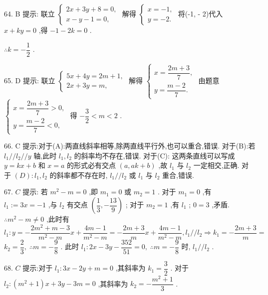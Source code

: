 64. B 提示: 联立 $\left\{  \begin{array}{l} {2x} + {3y} + 8 = 0, \\  x - y - 1 = 0, \end{array}\right.$ 解得 $\left\{  \begin{array}{l} x =  - 1, \\  y =  - 2. \end{array}\right.$ 将(-1, - 2)代入 $x + {ky} = 0$ ,得 $- 1 - {2k} = 0$ .

$\therefore k =  - \dfrac{1}{2}$ .

65. D 提示: 联立 $\left\{  \begin{array}{l} {5x} + {4y} = {2m} + 1, \\  {2x} + {3y} = m, \end{array}\right.$ 解得 $\left\{  \begin{array}{l} x = \dfrac{{2m} + 3}{7}, \\  y = \dfrac{m - 2}{7}. \end{array}\right.$ 由题意 $\left\{  \begin{array}{l} x = \dfrac{{2m} + 3}{7} > 0, \\  y = \dfrac{m - 2}{7} < 0, \end{array}\right.$ 得 $- \dfrac{3}{2} < m < 2$ .

66. C 提示:对于(A):两直线斜率相等,除两直线平行外,也可以重合,错误. 对于(B):若 ${l}_{1}//{l}_{2}//y$ 轴,此时 ${l}_{1},{l}_{2}$ 的斜率均不存在,错误. 对于(C): 这两条直线可以写成 $y = {kx} + b$ 和 $x = a$ 的形式必有交点 $\left( {a,{ak} + b}\right)$ ,故 ${l}_{1}$ 与 ${l}_{2}$ 一定相交,正确. 对于 $\left( D\right)  : {l}_{1},{l}_{2}$ 的斜率都不存在时, ${l}_{1}//{l}_{2}$ 或 ${l}_{1}$ 与 ${l}_{2}$ 重合,错误.

67. $C$ 提示: 若 ${m}^{2} - m = 0$ ,即 ${m}_{1} = 0$ 或 ${m}_{2} = 1$ . 对于 ${m}_{1} = 0$ ,有 ${l}_{1} \mathrel{\text{ := }} {3x} =  - 1$ ,与 ${l}_{2}$ 有交点 $\left( {\dfrac{1}{3}, - \dfrac{13}{9}}\right)$ ; 对于 ${m}_{2} = 1$ ,有 ${l}_{1}$ ; $0 = 3$ ,矛盾. $\therefore {m}^{2} - m \neq  0$ ,此时有 ${l}_{1} : y =  - \dfrac{2{m}^{2} + m - 3}{{m}^{2} - m}x + \dfrac{{4m} - 1}{{m}^{2} - m} =  - \dfrac{{2m} + 3}{m}x + \dfrac{{4m} - 1}{{m}^{2} - m},{l}_{1}//{l}_{2} \Rightarrow  {k}_{1} =  - \dfrac{{2m} + 3}{m} =$  ${k}_{2} = \dfrac{2}{3},\;\therefore m =  - \dfrac{9}{8}$ . 此时 ${l}_{1} : {2x} - {3y} - \dfrac{352}{51} = 0,\;\therefore m =  - \dfrac{9}{8}$ 时, ${l}_{1}//{l}_{2}$ .

68. $C$ 提示:对于 ${l}_{1} : {3x} - {2y} + m = 0$ ,其斜率为 ${k}_{1} = \dfrac{3}{2}$ . 对于 ${l}_{2} : \left( {{m}^{2} + 1}\right) x + {3y} - {3m} = 0$ ,其斜率为 ${k}_{2} =  - \dfrac{{m}^{2} + 1}{3}$ .

